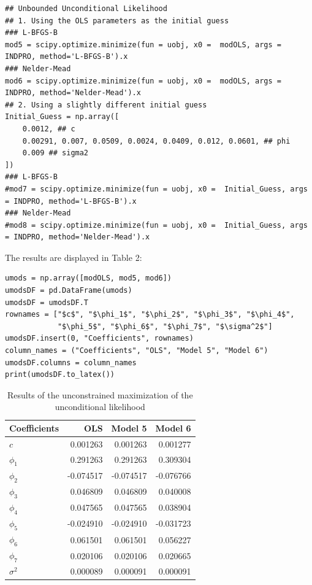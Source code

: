 \documentclass{article}
\begin{document}
\begin{verbatim}
## Unbounded Unconditional Likelihood
## 1. Using the OLS parameters as the initial guess
### L-BFGS-B
mod5 = scipy.optimize.minimize(fun = uobj, x0 =  modOLS, args = INDPRO, method='L-BFGS-B').x
### Nelder-Mead
mod6 = scipy.optimize.minimize(fun = uobj, x0 =  modOLS, args = INDPRO, method='Nelder-Mead').x
## 2. Using a slightly different initial guess
Initial_Guess = np.array([
    0.0012, ## c
    0.00291, 0.007, 0.0509, 0.0024, 0.0409, 0.012, 0.0601, ## phi
    0.009 ## sigma2 
])
### L-BFGS-B
#mod7 = scipy.optimize.minimize(fun = uobj, x0 =  Initial_Guess, args = INDPRO, method='L-BFGS-B').x
### Nelder-Mead
#mod8 = scipy.optimize.minimize(fun = uobj, x0 =  Initial_Guess, args = INDPRO, method='Nelder-Mead').x
\end{verbatim}
The results are displayed in Table 2:
\begin{verbatim}
umods = np.array([modOLS, mod5, mod6])
umodsDF = pd.DataFrame(umods)
umodsDF = umodsDF.T
rownames = ["$c$", "$\phi_1$", "$\phi_2$", "$\phi_3$", "$\phi_4$", 
            "$\phi_5$", "$\phi_6$", "$\phi_7$", "$\sigma^2$"]
umodsDF.insert(0, "Coefficients", rownames)
column_names = ("Coefficients", "OLS", "Model 5", "Model 6")
umodsDF.columns = column_names
print(umodsDF.to_latex())
\end{verbatim}

\begin{table}[h]
\centering
\caption{Results of the unconstrained maximization of the unconditional likelihood}
\begin{tabular}{lrrr}
\toprule
Coefficients & OLS & Model 5 & Model 6 \\
\midrule
$c$ & 0.001263 & 0.001263 & 0.001277 \\
$\phi_1$ & 0.291263 & 0.291263 & 0.309304 \\
$\phi_2$ & -0.074517 & -0.074517 & -0.076766 \\
$\phi_3$ & 0.046809 & 0.046809 & 0.040008 \\
$\phi_4$ & 0.047565 & 0.047565 & 0.038904 \\
$\phi_5$ & -0.024910 & -0.024910 & -0.031723 \\
$\phi_6$ & 0.061501 & 0.061501 & 0.056227 \\
$\phi_7$ & 0.020106 & 0.020106 & 0.020665 \\
$\sigma^2$ & 0.000089 & 0.000091 & 0.000091 \\
\bottomrule
\end{tabular}
\end{table}
\end{document}
